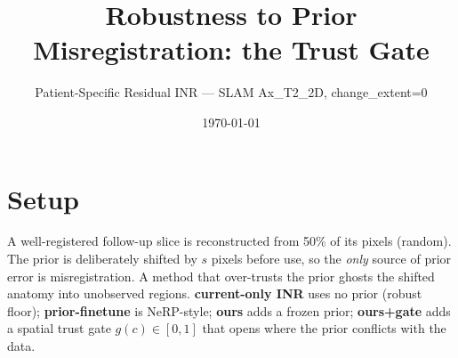 \documentclass[11pt]{article}
\title{Robustness to Prior Misregistration: the Trust Gate}
\author{Patient-Specific Residual INR --- SLAM Ax\_T2\_2D, change\_extent=0}
\date{\today}
\begin{document}
\maketitle
\section*{Setup}
A well-registered follow-up slice is reconstructed from 50\% of its pixels (random). The prior is deliberately shifted by $s$ pixels before use, so the \emph{only} source of prior error is misregistration. A method that over-trusts the prior ghosts the shifted anatomy into unobserved regions. \textbf{current-only INR} uses no prior (robust floor); \textbf{prior-finetune} is NeRP-style; \textbf{ours} adds a frozen prior; \textbf{ours+gate} adds a spatial trust gate $g(c)\in[0,1]$ that opens where the prior conflicts with the data.
\end{document}
